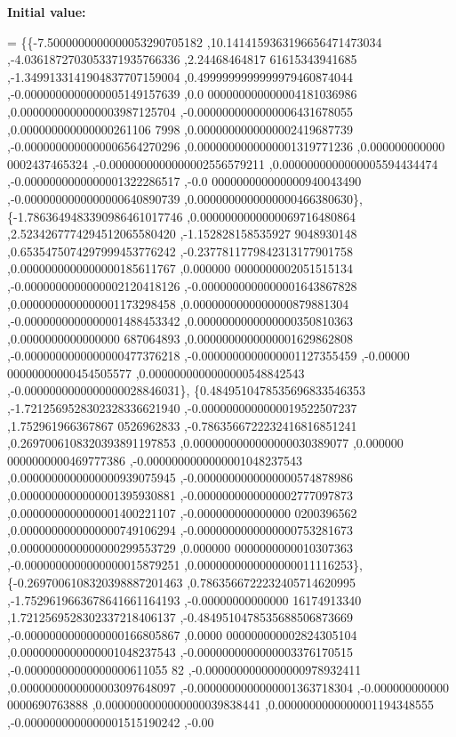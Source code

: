 {\bfseries Initial value\+:}
\begin{DoxyCode}
= \{\{-7.5000000000000053290705182 ,10.1414159363196656471473034 ,-4.0361872703053371935766336 ,2.24468464817
      61615343941685 ,-1.3499133141904837707159004 ,0.4999999999999979460874044 ,-0.0000000000000005149157639 ,0.0
      000000000000004181036986 ,0.0000000000000003987125704 ,-0.0000000000000006431678055 ,0.000000000000000261106
      7998 ,0.0000000000000002419687739 ,-0.0000000000000006564270296 ,0.0000000000000001319771236 ,0.000000000000
      0002437465324 ,-0.0000000000000002556579211 ,0.0000000000000005594434474 ,-0.0000000000000001322286517 ,-0.0
      000000000000000940043490 ,-0.0000000000000000640890739 ,0.0000000000000000466380630\},
\{-1.7863649483390986461017746 ,0.0000000000000069716480864 ,2.5234267774294512065580420 ,-1.152828158535927
      9048930148 ,0.6535475074297999453776242 ,-0.2377811779842313177901758 ,0.0000000000000000185611767 ,0.000000
      0000000002051515134 ,-0.0000000000000002120418126 ,-0.0000000000000001643867828 ,0.0000000000000001173298458
       ,0.0000000000000000879881304 ,-0.0000000000000001488453342 ,0.0000000000000000350810363 ,0.0000000000000000
      687064893 ,0.0000000000000001629862808 ,-0.0000000000000000477376218 ,-0.0000000000000001127355459 ,-0.00000
      00000000000454505577 ,0.0000000000000000548842543 ,-0.0000000000000000028846031\},
\{0.4849510478535696833546353 ,-1.7212569528302328336621940 ,-0.0000000000000019522507237 ,1.752961966367867
      0526962833 ,-0.7863566722232416816851241 ,0.2697006108320393891197853 ,0.0000000000000000030389077 ,0.000000
      0000000000469777386 ,-0.0000000000000001048237543 ,0.0000000000000000939075945 ,-0.0000000000000000574878986
       ,0.0000000000000001395930881 ,-0.0000000000000002777097873 ,0.0000000000000001400221107 ,-0.000000000000000
      0200396562 ,0.0000000000000000749106294 ,-0.0000000000000000753281673 ,0.0000000000000000299553729 ,0.000000
      0000000000010307363 ,-0.0000000000000000015879251 ,0.0000000000000000011116253\},
\{-0.2697006108320398887201463 ,0.7863566722232405714620995 ,-1.7529619663678641661164193 ,-0.00000000000000
      16174913340 ,1.7212569528302337218406137 ,-0.4849510478535688506873669 ,-0.0000000000000000166805867 ,0.0000
      000000000002824305104 ,0.0000000000000001048237543 ,-0.0000000000000003376170515 ,-0.00000000000000000611055
      82 ,-0.0000000000000000978932411 ,0.0000000000000003097648097 ,-0.0000000000000001363718304 ,-0.000000000000
      0000690763888 ,0.0000000000000000039838441 ,0.0000000000000001194348555 ,-0.0000000000000001515190242 ,-0.00

\end{DoxyCode}
